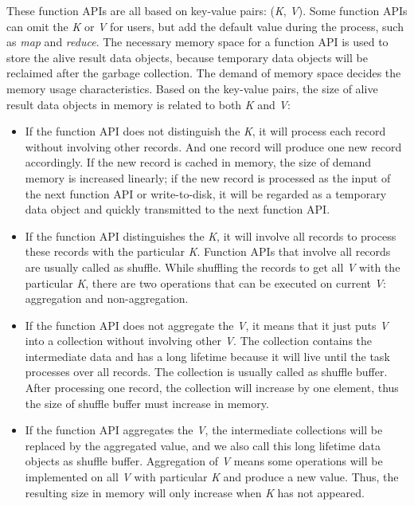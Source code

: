 These function APIs are all based on key-value pairs: (\textit{K}, \textit{V}). Some function APIs can omit the \textit{K} or \textit{V} for users, but add the default value during the process, such as \textit{map} and \textit{reduce}. The necessary memory space for a function API is used to store the alive result data objects, because temporary data objects will be reclaimed after the garbage collection. The demand of memory space decides the memory usage characteristics. Based on the key-value pairs, the size of alive result data objects in memory is related to both \textit{K} and \textit{V}:

\begin{itemize}

\item If the function API does not distinguish the \textit{K}, it will process each record without involving other records. And one record will produce one new record accordingly. If the new record is cached in memory, the size of demand memory is increased linearly; if the new record is processed as the input of the next function API or write-to-disk, it will be regarded as a temporary data object and quickly transmitted to the next function API.

\item If the function API distinguishes the \textit{K}, it will involve all records to process these records with the particular \textit{K}. Function APIs that involve all records are usually called as shuffle. While shuffling the records to get all \textit{V} with the particular \textit{K}, there are two operations that can be executed on current \textit{V}: aggregation and non-aggregation.

\item If the function API does not aggregate the \textit{V}, it means that it just puts \textit{V} into a collection without involving other \textit{V}. The collection contains the intermediate data and has a long lifetime because it will live until the task processes over all records. The collection is usually called as shuffle buffer. After processing one record, the collection will increase by one element, thus the size of shuffle buffer must increase in memory.

\item If the function API aggregates the \textit{V}, the intermediate collections will be replaced by the aggregated value, and we also call this long lifetime data objects as shuffle buffer. Aggregation of \textit{V} means some operations will be implemented on all \textit{V} with particular \textit{K} and produce a new value. Thus, the resulting size in memory will only increase when \textit{K} has not appeared.

\end{itemize}

